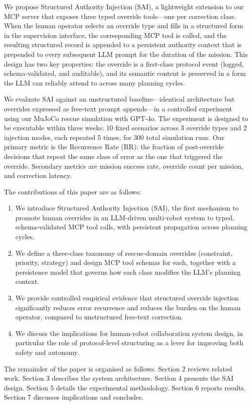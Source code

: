 We propose Structured Authority Injection (SAI), a lightweight extension to our MCP server that exposes three typed override tools—one per correction class. When the human operator selects an override type and fills in a structured form in the supervision interface, the corresponding MCP tool is called, and the resulting structured record is appended to a persistent authority context that is prepended to every subsequent LLM prompt for the duration of the mission. This design has two key properties: the override is a first-class protocol event (logged, schema-validated, and auditable), and its semantic content is preserved in a form the LLM can reliably attend to across many planning cycles.

We evaluate SAI against an unstructured baseline—identical architecture but overrides expressed as free-text prompt appends—in a controlled experiment using our MuJoCo rescue simulation with GPT-4o. The experiment is designed to be executable within three weeks: 10 fixed scenarios across 3 override types and 2 injection modes, each repeated 5 times, for 300 total simulation runs. Our primary metric is the Recurrence Rate (RR): the fraction of post-override decisions that repeat the same class of error as the one that triggered the override. Secondary metrics are mission success rate, override count per mission, and correction latency.

The contributions of this paper are as follows:

\begin{enumerate}
\item We introduce Structured Authority Injection (SAI), the first mechanism to promote human overrides in an LLM-driven multi-robot system to typed, schema-validated MCP tool calls, with persistent propagation across planning cycles.
\item We define a three-class taxonomy of rescue-domain overrides (constraint, priority, strategy) and design MCP tool schemas for each, together with a persistence model that governs how each class modifies the LLM's planning context.
\item We provide controlled empirical evidence that structured override injection significantly reduces error recurrence and reduces the burden on the human operator, compared to unstructured free-text correction.
\item We discuss the implications for human-robot collaboration system design, in particular the role of protocol-level structuring as a lever for improving both safety and autonomy.

\end{enumerate}

The remainder of the paper is organised as follows. Section 2 reviews related work. Section 3 describes the system architecture. Section 4 presents the SAI design. Section 5 details the experimental methodology. Section 6 reports results. Section 7 discusses implications and concludes.